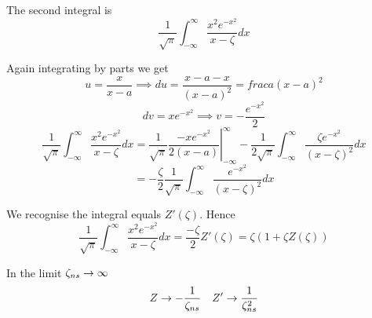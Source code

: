 The second integral is
\begin{equation}
	\frac{1}{\sqrt{\pi}} \int_{-\infty}^\infty \frac{x^2 e^{-x^2}}{x-\zeta} dx
\end{equation}

Again integrating by parts we get
\begin{equation*}
	u = \frac{x}{x - a} \implies du = \frac{x - a - x}{\left(x - a\right)^2} = frac{a}{\left(x - a\right)^2}
\end{equation*}
\begin{equation*}
	dv = xe^{-x^2} \implies v = -\frac{e^{-x^2}}{2}
\end{equation*}
\begin{equation*}
	\frac{1}{\sqrt{\pi}} \int_{-\infty}^\infty \frac{x^2 e^{-x^2}}{x-\zeta} dx = \frac{1}{\sqrt{\pi}} \left. \frac{-xe^{-x^2}}{2 \left( x - a \right)} \right|_{-\infty}^\infty - \frac{1}{2 \sqrt{\pi}} \int_{-\infty}^\infty \frac{\zeta e^{-x^2}}{\left( x - \zeta \right)^2} dx
\end{equation*}
\begin{equation}
	= -\frac{\zeta}{2} \frac{1}{\sqrt{\pi}} \int_{-\infty}^\infty \frac{e^{-x^2}}{\left( x - \zeta \right)^2} dx
\end{equation}

We recognise the integral equals $Z' \left( \zeta \right)$. Hence
\begin{equation}\label{plasma_dispersion_x2_int}
	\frac{1}{\sqrt{\pi}} \int_{-\infty}^\infty \frac{x^2 e^{-x^2}}{x-\zeta} dx = \frac{-\zeta}{2} Z' \left( \zeta \right) = \zeta \left( 1 + \zeta Z \left( \zeta \right) \right)
\end{equation}

In the limit $\zeta_{ns} \to \infty$
\begin{equation}
	Z \to -\frac{1}{\zeta_{ns}} \quad Z' \to \frac{1}{\zeta_{ns}^2}
\end{equation}